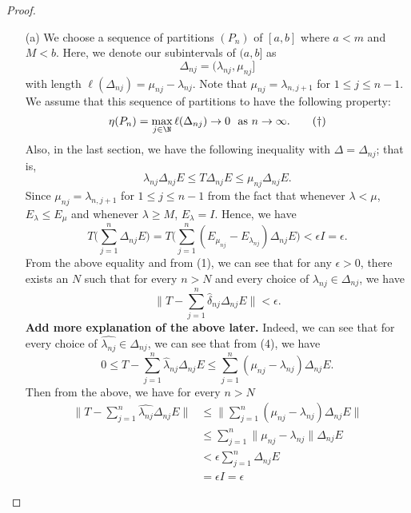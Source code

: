 \begin{proof}
\begin{enumerate}
    \item[(a)] We choose a sequence of partitions \( ({P}_{n}) \) of \( [a,b] \) where \( a  < m  \) and \( M < b \). Here, we denote our subintervals of \( (a,b] \) as
        \[  \Delta_{nj} = ({\lambda}_{nj}, {\mu}_{nj}] \tag{\( 1 \leq j \leq n  \)} \]
        with length \( \ell(\Delta_{nj}) = {\mu}_{nj} - {\lambda}_{nj} \). Note that \( \mu_{nj} = {\lambda}_{n,j+1}  \) for \( 1 \leq j \leq n - 1  \). We assume that this sequence of partitions to have the following property:
        \[  \eta({P}_{n}) = \max_{j \in \N} \ell (\Delta_{nj}) \to 0 \ \ \text{as} \ n \to \infty. \tag{\(\dagger\)} \]
        Also, in the last section, we have the following inequality with \( \Delta = {\Delta}_{nj} \); that is, 
        \[  {\lambda}_{nj} \Delta_{nj} E \leq T \Delta_{nj} E  \leq \mu_{nj} \Delta_{nj} E. \tag{4}   \]
        Since \( \mu_{nj} = {\lambda}_{n,j+1}  \) for \( 1 \leq j \leq n - 1  \) from the fact that whenever \( \lambda <  \mu  \), \( {E}_{\lambda} \leq {E}_{\mu} \) and whenever \( \lambda \geq M  \), \( {E}_{\lambda} = I  \). Hence, we have
        \[  T \Big(  \sum_{ j=1  }^{ n  } \Delta_{nj} E  \Big) = T \Big(  \sum_{ j=1  }^{ n } ({E}_{{\mu }_{nj}} - {E}_{{\lambda}_{nj}}) \Delta_{nj} E  \Big) < \epsilon I  = \epsilon. \]
        From the above equality and from (1), we can see that for any \( \epsilon > 0  \), there exists an \( N  \) such that for every \( n  > N  \) and every choice of \( {\lambda}_{nj} \in \Delta_{nj} \), we have 
        \[  \|T  - \sum_{ j=1  }^{ n } \hat{\delta}_{nj} \Delta_{nj} E  \| < \epsilon. \tag{5} \]
        \textbf{Add more explanation of the above later.} Indeed, we can see that for every choice of \( \hat{{\lambda}_{nj}} \in \Delta_{nj} \), we can see that from (4), we have
        \[  0 \leq T - \sum_{ j=1  }^{ n } {\hat{\lambda}}_{nj} \Delta_{nj} E \leq \sum_{ j=1  }^{ n } ({\mu }_{nj} - {\lambda}_{nj}) \Delta_{nj} E.  \tag{6} \]
        Then from the above, we have for every \( n > N  \)
        \begin{align*}
            \Big\|T - \sum_{ j=1  }^{ n} \hat{\lambda_{nj}} \Delta_{nj} E \Big\| &\leq \Big\|\sum_{ j=1  }^{ n } ({\mu }_{nj } - {\lambda}_{nj } )  \Delta_{nj} E \Big\|  \\
                                                                                 &\leq \sum_{ j=1  }^{ n } \|{\mu}_{nj} - {\lambda}_{nj} \| \Delta_{nj} E \\
                                                                                 &< \epsilon \sum_{ j=1  }^{ n } \Delta_{nj} E \\
                                                                                 &= \epsilon I = \epsilon
        \end{align*}


\end{enumerate}
\end{proof}
